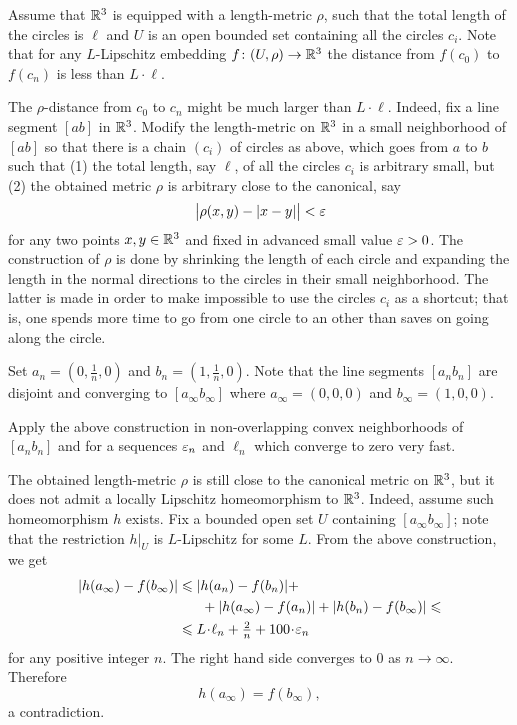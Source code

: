 Assume that $\mathbb{R}^3$ is equipped with a length-metric $\rho$,
such that the total length of the circles is $\ell$
and $U$ is an open bounded set containing all the circles $c_i$.
Note that for any $L$-Lipschitz embedding $f\colon(U,\rho)\to\mathbb{R}^3$ the distance from $f(c_0)$ to $f(c_n)$ is less than $L\cdot\ell$.

The $\rho$-distance from $c_0$ to $c_n$ might be much larger than $L\cdot\ell$.
Indeed, fix a line segment $[ab]$ in $\mathbb{R}^3$.
Modify 
the length-metric on $\mathbb{R}^3$ in a small neighborhood of $[ab]$
so that there is a chain $(c_i)$ of circles as above,
which goes from $a$ to $b$ 
such that
(1) the total length, say $\ell$, 
of all the circles $c_i$ is arbitrary small,
but 
(2) the obtained metric $\rho$ 
is arbitrary close to the canonical, say
\[\bigl|\rho(x,y)-|x-y|\bigr|<\varepsilon\]
for any two points $x,y\in\mathbb{R}^3$
and fixed in advanced small value $\varepsilon>0$.
The construction of $\rho$ 
is done by shrinking the length of each circle
and expanding the length in the normal directions  
to the circles in their small neighborhood.
The latter is made in order to make impossible to use the circles $c_i$ as a shortcut;
that is, one spends more time to go from one circle to an other 
than saves on going along the circle.

Set $a_n=(0,\tfrac1n,0)$ and $b_n=(1,\tfrac1n,0)$.
Note that the line segments $[a_nb_n]$ are disjoint and converging
to $[a_\infty b_\infty]$
where $a_\infty=(0,0,0)$ and $b_\infty=(1,0,0)$.

Apply the above construction in non-overlapping convex neighborhoods of $[a_nb_n]$ 
and for a sequences 
$\varepsilon_n$ and $\ell_n$ 
which converge to zero very fast.

The obtained length-metric $\rho$ is still close to the canonical metric on $\mathbb{R}^3$,
but it does not admit 
a locally Lipschitz homeomorphism to $\mathbb{R}^3$.
Indeed, 
assume such homeomorphism $h$ exists.
Fix a bounded open set $U$ containing $[a_\infty b_\infty]$;
note that the restriction $h|_U$ is $L$-Lipschitz for some $L$.
From the above construction,
we get 
\begin{align*}
|h(a_\infty)-f(b_\infty)|
&\le 
|h(a_n)-f(b_n)|
+
\\
&\ \ \ \ \ +
|h(a_\infty)-f(a_n)|
+
|h(b_n)-f(b_\infty)|
\le
\\
&\le
L\cdot\ell_n+\tfrac2n+100\cdot\eps_n
\end{align*}
for any positive integer $n$.
The right hand side converges to $0$ as $n\to\infty$.
Therefore 
\[h(a_\infty)=f(b_\infty),\] 
a contradiction.\qeds



